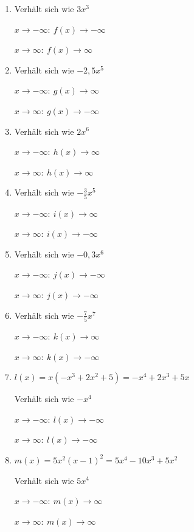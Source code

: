 \begin{Answer}[ref=ganzVerA1]

	\begin{minipage}{\textwidth}
		\begin{minipage}[t]{0.5\textwidth}
			\begin{enumerate}[label=\alph*)]
				\item Verhält sich wie \(3x^3\)

				\(x\to-\infty\colon\ f(x)\to-\infty\)

				\(x\to\infty\colon\ f(x)\to\infty\)
				\item Verhält sich wie \(-2,5x^5\)

				\(x\to-\infty\colon\ g(x)\to\infty\)

				\(x\to\infty\colon\ g(x)\to-\infty\)
				\item Verhält sich wie \(2x^6\)

				\(x\to-\infty\colon\ h(x)\to\infty\)

				\(x\to\infty\colon\ h(x)\to\infty\)
				\item Verhält sich wie \(-\frac{3}{5}x^5\)

				\(x\to-\infty\colon\ i(x)\to\infty\)

				\(x\to\infty\colon\ i(x)\to-\infty\)
			\end{enumerate}
		\end{minipage}%
		\begin{minipage}[t]{0.5\textwidth}
			\begin{enumerate}[label=\alph*)]
				\setcounter{enumi}{4}
				\item Verhält sich wie \(-0,3x^6\)

				\(x\to-\infty\colon\ j(x)\to-\infty\)

				\(x\to\infty\colon\ j(x)\to-\infty\)
				\item Verhält sich wie \(-\frac{7}{5}x^7\)

				\(x\to-\infty\colon\ k(x)\to\infty\)

				\(x\to\infty\colon\ k(x)\to-\infty\)
				\item \(l(x)=x\left(-x^3+2x^2+5\right)=-x^4+2x^3+5x\)

				Verhält sich wie \(-x^4\)

				\(x\to-\infty\colon\ l(x)\to-\infty\)

				\(x\to\infty\colon\ l(x)\to-\infty\)
				\item \(m(x)=5x^2\left(x-1\right)^2=5x^4-10x^3+5x^2\)

				Verhält sich wie \(5x^4\)

				\(x\to-\infty\colon\ m(x)\to\infty\)

				\(x\to\infty\colon\ m(x)\to\infty\)
			\end{enumerate}
		\end{minipage}%
	\end{minipage}
\end{Answer}


